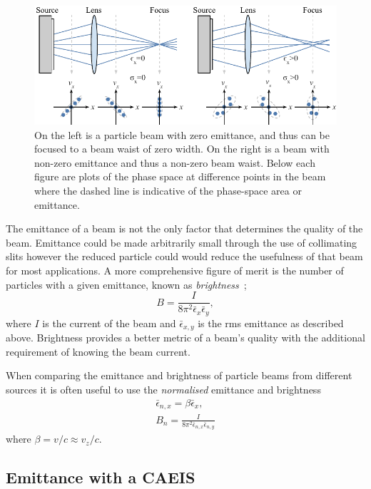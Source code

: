 \begin{figure}
\center
\includegraphics{part2/Figs/EmittanceFocasability.pdf}
\caption{On the left is a particle beam with zero emittance, and thus can be focused to a beam waist of zero width. On the right is a beam with non-zero emittance and thus a non-zero beam waist. Below each figure are plots of the phase space at difference points in the beam where the dashed line is indicative of the phase-space area or emittance.}
\label{figure:focusability}
\end{figure}

The emittance of a beam is not the only factor that determines the quality of the beam.
Emittance could be made arbitrarily small through the use of collimating slits however the reduced particle could would reduce the usefulness of that beam for most applications.
A more comprehensive figure of merit is the number of particles with a given emittance, known as \emph{brightness}~\cite{reiser_theory_2008};
\begin{equation}
B = \frac{I}{8\pi^2\bar{\epsilon}_x\bar{\epsilon}_y},
\end{equation}
where $I$ is the current of the beam and $\bar{\epsilon}_{x,y}$ is the \gls{rms} emittance as described above.
Brightness provides a better metric of a beam's quality with the additional requirement of knowing the beam current.

When comparing the emittance and brightness of particle beams from different sources it is often useful to use the \emph{normalised} emittance and brightness
\begin{align}
\bar{\epsilon}_{n,x} = \beta\bar{\epsilon}_x,\\
B_n = \frac{I}{8\pi^2\bar{\epsilon}_{n,x}\bar{\epsilon}_{n,y}}
\end{align}
where $\beta=v/c\approx v_z/c$.


\subsection{Emittance with a CAEIS}
\label{section:excess_energy_emittance}

